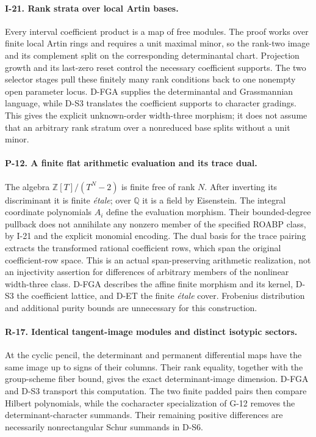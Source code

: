 \documentclass[11pt,a4paper]{article}
\theoremstyle{definition}\newtheorem{definition}{Definition}
\begin{document}
\paragraph{I-21. Rank strata over local Artin bases.}
Every interval coefficient product is a map of free modules. The proof works over finite local Artin rings and requires a unit maximal minor, so the rank-two image and its complement split on the corresponding determinantal chart. Projection growth and its last-zero reset control the necessary coefficient supports. The two selector stages pull these finitely many rank conditions back to one nonempty open parameter locus. D-FGA supplies the determinantal and Grassmannian language, while D-S3 translates the coefficient supports to character gradings. This gives the explicit unknown-order width-three morphism; it does not assume that an arbitrary rank stratum over a nonreduced base splits without a unit minor.

\paragraph{P-12. A finite flat arithmetic evaluation and its trace dual.}
The algebra $\mathbb Z[T]/(T^N-2)$ is finite free of rank $N$. After inverting its discriminant it is finite \emph{\'etale}; over $\mathbb Q$ it is a field by Eisenstein. The integral coordinate polynomials $A_i$ define the evaluation morphism. Their bounded-degree pullback does not annihilate any nonzero member of the specified ROABP class, by I-21 and the explicit monomial encoding. The dual basis for the trace pairing extracts the transformed rational coefficient rows, which span the original coefficient-row space. This is an actual span-preserving arithmetic realization, not an injectivity assertion for differences of arbitrary members of the nonlinear width-three class. D-FGA describes the affine finite morphism and its kernel, D-S3 the coefficient lattice, and D-ET the finite \emph{\'etale} cover. Frobenius distribution and additional purity bounds are unnecessary for this construction.


\paragraph{R-17. Identical tangent-image modules and distinct isotypic sectors.}
At the cyclic pencil, the determinant and permanent differential maps have the same image up to signs of their columns. Their rank equality, together with the group-scheme fiber bound, gives the exact determinant-image dimension. D-FGA and D-S3 transport this computation. The two finite padded pairs then compare Hilbert polynomials, while the cocharacter specialization of G-12 removes the determinant-character summands. Their remaining positive differences are necessarily nonrectangular Schur summands in D-S6.
\end{document}
